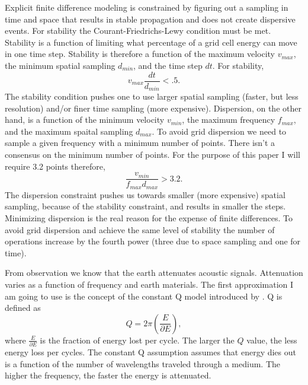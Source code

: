 Explicit finite difference modeling is constrained by figuring  out a sampling in time and space that results in stable propagation and does not create dispersive events.  For stability the Courant-Friedrichs-Lewy condition \cite[]{courant1967partial} must be met. 
Stability is a function of limiting what percentage of a grid cell energy can move in one time step. Stability is therefore a function of the maximum velocity 
$v_{max}$, the minimum spatial sampling 
$d_{min}$, and the time step $dt$. For stability,
\begin{equation}
v_{max}\frac{dt}{d_{min}} < .5 \label{eq:stability}.
\end{equation}
The stability condition pushes one to use larger spatial sampling (faster, but less resolution) and/or finer time sampling (more expensive).  Dispersion, on the other hand, is a function of the minimum velocity $v_{min}$, the maximum frequency $f_{max}$, and the maximum spaital sampling $d_{max}$.   To avoid grid dispersion we need to  sample a given frequency with a minimum number of points.  There isn't a consensus on the minimum number
of points. For the purpose of this paper I will require  3.2  points therefore,
\begin{equation}
\frac{v_{min} }{f_{max}d_{max}} > 3.2 \label{eq:dispersion}. 
\end{equation}
The dispersion constraint pushes us towards smaller (more expensive) spatial sampling, because of the stability constraint, and results in smaller the
steps.
Minimizing dispersion is the real reason for the expense of finite differences.  To avoid grid dispersion and achieve the same level of stability the number of operations increase by the fourth power (three due to space sampling and one for time).
\par
From observation we know that the earth attenuates acoustic signals.  Attenuation varies as a function of frequency and earth materials. The first approximation I am going to use is the concept of the constant
Q model introduced by \cite{Kjartansson.sep.23}. 
Q is defined as
\begin{equation}
Q=2 \pi \left( \frac{E}{\partial E}\right),
\end{equation}
where $\frac{E}{\partial E}$ is the fraction of energy lost per cycle. The larger the $Q$ value, the less energy loss per cycles.
 The constant Q assumption assumes that energy dies out is a function of the number of wavelengths traveled through a medium. The higher the frequency, the faster the energy is attenuated.
